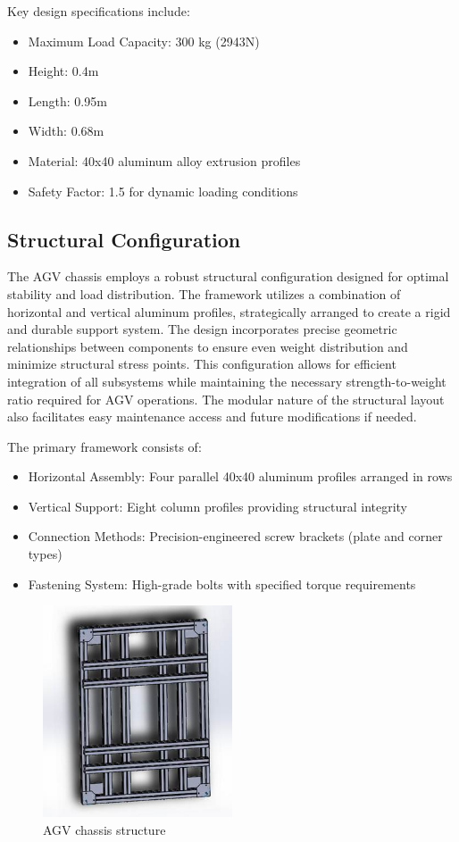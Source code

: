 \documentclass[../../main]{subfiles}
\begin{document}
Key design specifications include:

\begin{itemize}
\item
  Maximum Load Capacity: 300 kg (2943N)
\item
  Height: 0.4m
\item
  Length: 0.95m
\item
  Width: 0.68m
\item
  Material: 40x40 aluminum alloy extrusion profiles
\item
  Safety Factor: 1.5 for dynamic loading conditions
\end{itemize}

\subsection{Structural Configuration}\label{structural-configuration}

The AGV chassis employs a robust structural configuration designed for
optimal stability and load distribution. The framework utilizes a
combination of horizontal and vertical aluminum profiles, strategically
arranged to create a rigid and durable support system. The design
incorporates precise geometric relationships between components to
ensure even weight distribution and minimize structural stress points.
This configuration allows for efficient integration of all subsystems
while maintaining the necessary strength-to-weight ratio required for
AGV operations. The modular nature of the structural layout also
facilitates easy maintenance access and future modifications if needed.

The primary framework consists of:

\begin{itemize}
\item
  Horizontal Assembly: Four parallel 40x40 aluminum profiles arranged in
  rows
\item
  Vertical Support: Eight column profiles providing structural integrity
\item
  Connection Methods: Precision-engineered screw brackets (plate and
  corner types)
\item
  Fastening System: High-grade bolts with specified torque requirements
\end{itemize}

\begin{figure}[h!]
  \centering
  \includegraphics[width=0.5\textwidth]{img/image110.jpg}
  \caption{AGV chassis structure}
  \end{figure}
  
\end{document}
